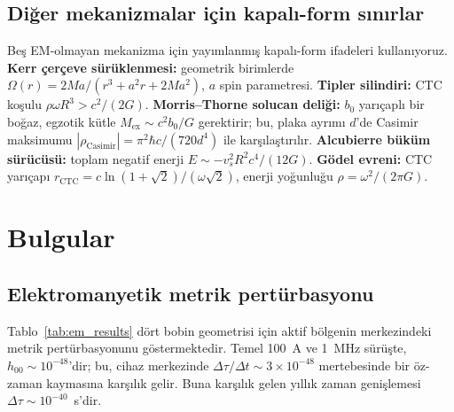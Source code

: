 \documentclass[11pt,a4paper,twocolumn]{article}
\begin{document}
\subsection{Diğer mekanizmalar için kapalı-form sınırlar}
\label{subsec:other}

Beş EM-olmayan mekanizma için yayımlanmış kapalı-form ifadeleri
kullanıyoruz. \textbf{Kerr çerçeve sürüklenmesi:}
geometrik birimlerde $\Omega(r) = 2Ma/(r^3 + a^2 r + 2Ma^2)$, $a$
spin parametresi. \textbf{Tipler silindiri:} CTC koşulu
$\rho\omega R^3 > c^2/(2G)$. \textbf{Morris--Thorne solucan deliği:}
$b_0$ yarıçaplı bir boğaz, egzotik kütle
$M_{\text{ex}} \sim c^2 b_0/G$ gerektirir; bu, plaka ayrımı $d$'de
Casimir maksimumu
$|\rho_{\text{Casimir}}| = \pi^2 \hbar c / (720 d^4)$ ile
karşılaştırılır. \textbf{Alcubierre büküm sürücüsü:} toplam negatif
enerji $E \sim -v_s^2 R^2 c^4/(12G)$. \textbf{Gödel evreni:} CTC
yarıçapı $r_{\text{CTC}} = c\ln(1+\sqrt{2})/(\omega\sqrt{2})$,
enerji yoğunluğu $\rho = \omega^2/(2\pi G)$.


\section{Bulgular}
\label{sec:results}

\subsection{Elektromanyetik metrik pertürbasyonu}
\label{subsec:em_results}

Tablo~\ref{tab:em_results} dört bobin geometrisi için aktif bölgenin
merkezindeki metrik pertürbasyonunu göstermektedir. Temel 100~A ve
1~MHz sürüşte, $h_{00} \sim 10^{-48}$'dir; bu, cihaz merkezinde
$\Delta\tau/\Delta t \sim 3\times 10^{-48}$ mertebesinde bir öz-zaman
kaymasına karşılık gelir. Buna karşılık gelen yıllık zaman genişlemesi
$\Delta\tau \sim 10^{-40}$~s'dir.

\begin{table}[t]
\centering
\small
\caption{Cihaz merkezinde EM kaynaklı metrik pertürbasyonu
(temel 100~A, 1~MHz).}
\label{tab:em_results}
\end{table}
\end{document}
